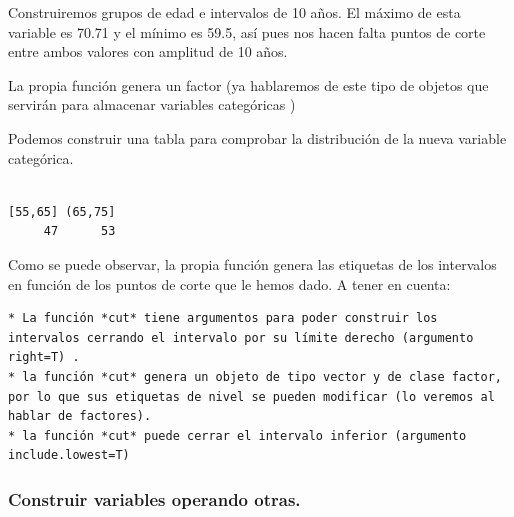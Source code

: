 \documentclass[
  letterpaper,
  DIV=11,
  numbers=noendperiod]{scrreprt}
\newenvironment{Shaded}{\begin{snugshade}}{\end{snugshade}}
\newcommand{\AttributeTok}[1]{\textcolor[rgb]{0.40,0.45,0.13}{#1}}
\newcommand{\CommentTok}[1]{\textcolor[rgb]{0.37,0.37,0.37}{#1}}
\newcommand{\DecValTok}[1]{\textcolor[rgb]{0.68,0.00,0.00}{#1}}
\newcommand{\FunctionTok}[1]{\textcolor[rgb]{0.28,0.35,0.67}{#1}}
\newcommand{\NormalTok}[1]{\textcolor[rgb]{0.00,0.23,0.31}{#1}}
\newcommand{\OtherTok}[1]{\textcolor[rgb]{0.00,0.23,0.31}{#1}}
\newcommand{\SpecialCharTok}[1]{\textcolor[rgb]{0.37,0.37,0.37}{#1}}
\begin{document}
Construiremos grupos de edad e intervalos de 10 años. El máximo de esta
variable es 70.71 y el mínimo es 59.5, así pues nos hacen falta puntos
de corte entre ambos valores con amplitud de 10 años.

\begin{Shaded}
\end{Shaded}

La propia función genera un factor (ya hablaremos de este tipo de
objetos que servirán para almacenar variables categóricas )

Podemos construir una tabla para comprobar la distribución de la nueva
variable categórica.

\begin{Shaded}
\end{Shaded}

\begin{verbatim}

[55,65] (65,75] 
     47      53 
\end{verbatim}

Como se puede observar, la propia función genera las etiquetas de los
intervalos en función de los puntos de corte que le hemos dado. A tener
en cuenta:

\begin{verbatim}
* La función *cut* tiene argumentos para poder construir los intervalos cerrando el intervalo por su límite derecho (argumento right=T) .
* la función *cut* genera un objeto de tipo vector y de clase factor, por lo que sus etiquetas de nivel se pueden modificar (lo veremos al hablar de factores).
* la función *cut* puede cerrar el intervalo inferior (argumento include.lowest=T)
\end{verbatim}

\hypertarget{construir-variables-operando-otras.}{%
\subsubsection{Construir variables operando
otras.}\label{construir-variables-operando-otras.}}
\end{document}
